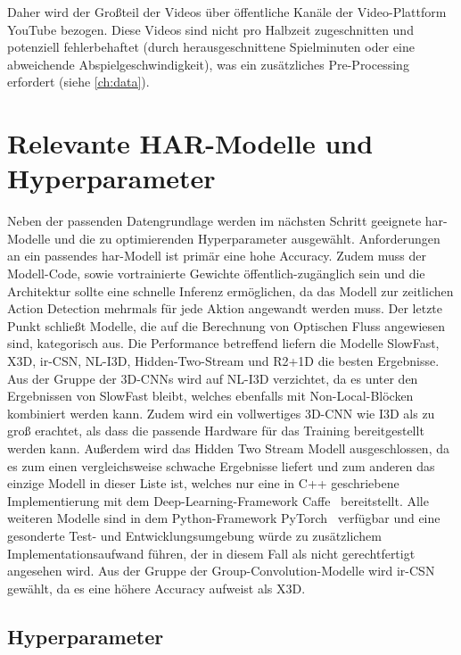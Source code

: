 Daher wird der Großteil der Videos über öffentliche Kanäle der Video-Plattform YouTube bezogen.
Diese Videos sind nicht pro Halbzeit zugeschnitten und potenziell fehlerbehaftet (\zB durch herausgeschnittene Spielminuten oder eine abweichende Abspielgeschwindigkeit), was ein zusätzliches Pre-Processing erfordert (siehe \autoref{ch:data}).

\section{Relevante HAR-Modelle und Hyperparameter}
\label{sec:decisions}

Neben der passenden Datengrundlage werden im nächsten Schritt geeignete \gls{har}-Modelle und die zu optimierenden Hyperparameter ausgewählt.
Anforderungen an ein passendes \gls{har}-Modell ist primär eine hohe Accuracy.
Zudem muss der Modell-Code, sowie vortrainierte Gewichte öffentlich-zugänglich sein und die Architektur sollte eine schnelle Inferenz ermöglichen, da das Modell zur zeitlichen Action Detection mehrmals für jede Aktion angewandt werden muss.
Der letzte Punkt schließt Modelle, die auf die Berechnung von Optischen Fluss angewiesen sind, kategorisch aus.
Die Performance betreffend liefern die Modelle SlowFast, X3D, ir-CSN, NL-I3D, Hidden-Two-Stream und R2+1D die besten Ergebnisse.
Aus der Gruppe der 3D-CNNs wird auf NL-I3D verzichtet, da es unter den Ergebnissen von SlowFast bleibt, welches ebenfalls mit Non-Local-Blöcken kombiniert werden kann.
Zudem wird ein vollwertiges 3D-CNN wie I3D als zu groß erachtet, als dass die passende Hardware für das Training bereitgestellt werden kann.
Außerdem wird das Hidden Two Stream Modell ausgeschlossen, da es zum einen vergleichsweise schwache Ergebnisse liefert und zum anderen das einzige Modell in dieser Liste ist, welches nur eine in C++ geschriebene Implementierung mit dem Deep-Learning-Framework Caffe~\cite{Jia14} bereitstellt.
Alle weiteren Modelle sind in dem Python-Framework PyTorch~\cite{Paszke19} verfügbar und eine gesonderte Test- und Entwicklungsumgebung würde zu zusätzlichem Implementationsaufwand führen, der in diesem Fall als nicht gerechtfertigt angesehen wird.
Aus der Gruppe der Group-Convolution-Modelle wird ir-CSN gewählt, da es eine höhere Accuracy aufweist als X3D.

\subsection{Hyperparameter}
\label{subsec:hyperparameter}

